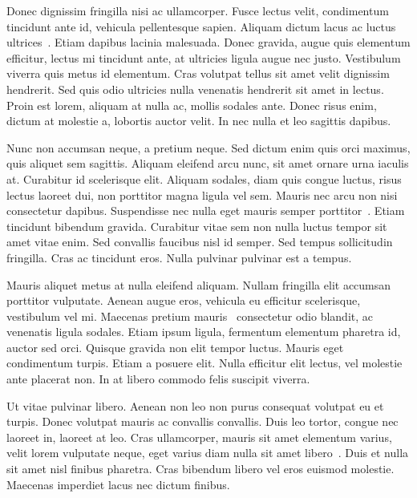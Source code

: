 Donec dignissim fringilla nisi ac ullamcorper. Fusce lectus velit, condimentum tincidunt ante id, vehicula pellentesque sapien. Aliquam dictum lacus ac luctus ultrices~\cite{inbook}. Etiam dapibus lacinia malesuada. Donec gravida, augue quis elementum efficitur, lectus mi tincidunt ante, at ultricies ligula augue nec justo. Vestibulum viverra quis metus id elementum. Cras volutpat tellus sit amet velit dignissim hendrerit. Sed quis odio ultricies nulla venenatis hendrerit sit amet in lectus. Proin est lorem, aliquam at nulla ac, mollis sodales ante. Donec risus enim, dictum at molestie a, lobortis auctor velit. In nec nulla et leo sagittis dapibus.

Nunc non accumsan neque, a pretium neque. Sed dictum enim quis orci maximus, quis aliquet sem sagittis. Aliquam eleifend arcu nunc, sit amet ornare urna iaculis at. Curabitur id scelerisque elit. Aliquam sodales, diam quis congue luctus, risus lectus laoreet dui, non porttitor magna ligula vel sem. Mauris nec arcu non nisi consectetur dapibus. Suspendisse nec nulla eget mauris semper porttitor~\cite{incollection}. Etiam tincidunt bibendum gravida. Curabitur vitae sem non nulla luctus tempor sit amet vitae enim. Sed convallis faucibus nisl id semper. Sed tempus sollicitudin fringilla. Cras ac tincidunt eros. Nulla pulvinar pulvinar est a tempus.

Mauris aliquet metus at nulla eleifend aliquam. Nullam fringilla elit accumsan porttitor vulputate. Aenean augue eros, vehicula eu efficitur scelerisque, vestibulum vel mi. Maecenas pretium mauris~\cite{manual} consectetur odio blandit, ac venenatis ligula sodales. Etiam ipsum ligula, fermentum elementum pharetra id, auctor sed orci. Quisque gravida non elit tempor luctus. Mauris eget condimentum turpis. Etiam a posuere elit. Nulla efficitur elit lectus, vel molestie ante placerat non. In at libero commodo felis suscipit viverra.

Ut vitae pulvinar libero. Aenean non leo non purus consequat volutpat eu et turpis. Donec volutpat mauris ac convallis convallis. Duis leo tortor, congue nec laoreet in, laoreet at leo. Cras ullamcorper, mauris sit amet elementum varius, velit lorem vulputate neque, eget varius diam nulla sit amet libero~\cite{techreport}. Duis et nulla sit amet nisl finibus pharetra. Cras bibendum libero vel eros euismod molestie. Maecenas imperdiet lacus nec dictum finibus.
